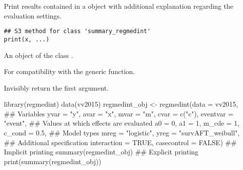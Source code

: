 \documentclass[a4paper]{book}
\begin{document}
%
\begin{Description}
Print results contained in a  object with additional explanation regarding the evaluation settings.
\end{Description}
%
\begin{Usage}
\begin{verbatim}
## S3 method for class 'summary_regmedint'
print(x, ...)
\end{verbatim}
\end{Usage}
%
\begin{Arguments}
\begin{ldescription}
\item[\code{x}] An object of the class .

\item[\code{...}] For compatibility with the generic function.
\end{ldescription}
\end{Arguments}
%
\begin{Value}
Invisibly return the first argument.
\end{Value}
%
\begin{Examples}
\begin{ExampleCode}
library(regmedint)
data(vv2015)
regmedint_obj <- regmedint(data = vv2015,
                           ## Variables
                           yvar = "y",
                           avar = "x",
                           mvar = "m",
                           cvar = c("c"),
                           eventvar = "event",
                           ## Values at which effects are evaluated
                           a0 = 0,
                           a1 = 1,
                           m_cde = 1,
                           c_cond = 0.5,
                           ## Model types
                           mreg = "logistic",
                           yreg = "survAFT_weibull",
                           ## Additional specification
                           interaction = TRUE,
                           casecontrol = FALSE)
## Implicit printing
summary(regmedint_obj)
## Explicit printing
print(summary(regmedint_obj))

\end{ExampleCode}
\end{Examples}
\end{document}
